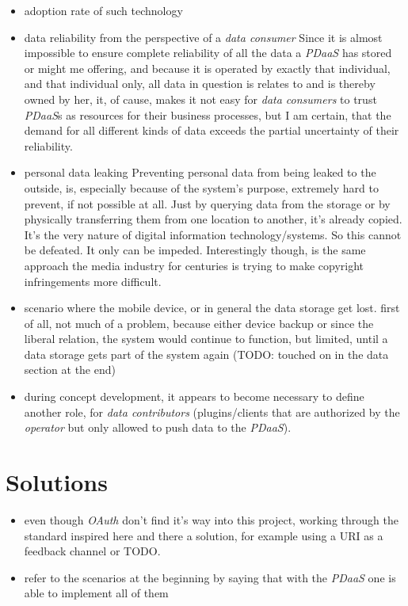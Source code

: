 \documentclass[12pt,english,a4paper,titlepage,cleardoublepage=empty,dottedtoc]{report}
\begin{document}
\begin{itemize}
\item
  adoption rate of such technology
\item
  data reliability from the perspective of a \emph{data consumer} Since
  it is almost impossible to ensure complete reliability of all the data
  a \emph{PDaaS} has stored or might me offering, and because it is
  operated by exactly that individual, and that individual only, all
  data in question is relates to and is thereby owned by her, it, of
  cause, makes it not easy for \emph{data consumers} to trust
  \emph{PDaaS}s as resources for their business processes, but I am
  certain, that the demand for all different kinds of data exceeds the
  partial uncertainty of their reliability.
\item
  personal data leaking Preventing personal data from being leaked to
  the outside, is, especially because of the system's purpose, extremely
  hard to prevent, if not possible at all. Just by querying data from
  the storage or by physically transferring them from one location to
  another, it's already copied. It's the very nature of digital
  information technology/systems. So this cannot be defeated. It only
  can be impeded. Interestingly though, is the same approach the media
  industry for centuries is trying to make copyright infringements more
  difficult.
\item
  scenario where the mobile device, or in general the data storage get
  lost. first of all, not much of a problem, because either device
  backup or since the liberal relation, the system would continue to
  function, but limited, until a data storage gets part of the system
  again (TODO: touched on in the data section at the end)
\item
  during concept development, it appears to become necessary to define
  another role, for \emph{data contributors} (plugins/clients that are
  authorized by the \emph{operator} but only allowed to push data to the
  \emph{PDaaS}).
\end{itemize}

\section{Solutions}\label{solutions}

\begin{itemize}
\item
  even though \emph{OAuth} don't find it's way into this project,
  working through the standard inspired here and there a solution, for
  example using a URI as a feedback channel or TODO.
\item
  refer to the scenarios at the beginning by saying that with the
  \emph{PDaaS} one is able to implement all of them
\end{itemize}
\end{document}
